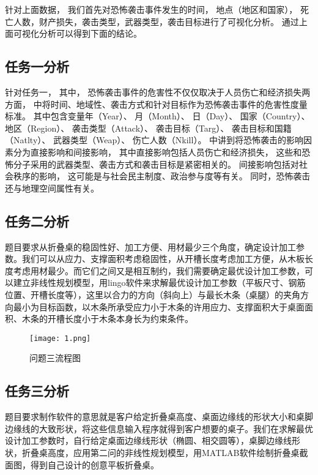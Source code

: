 \documentclass[bwprint]{gmcmthesis}
\begin{document}
针对上面数据，
我们首先对恐怖袭击事件发生的时间，
地点（地区和国家），
死亡人数，财产损失，袭击类型，武器类型，袭击目标进行了可视化分析。
通过上面可视化分析可以得到下面的结论。


\subsection{任务一分析}

针对任务一，
其中，
恐怖袭击事件的危害性不仅仅取决于人员伤亡和经济损失两方面，
\cite{贺怀清2012恐怖袭击事件不确定性度量及可视分析}
中将时间、地域性、袭击方式和针对目标作为恐怖袭击事件的危害性度量标准。
其中包含变量年（Year）、
月（Month）、
日（Day）、
国家（Country）、
地区（Region）、
袭击类型（Attack）、
袭击目标（Targ）、
袭击目标和国籍（Natlty）、
武器类型（Weap）、
伤亡人数（Nkill）。
\cite{李国辉2014全球恐怖袭击时空演变及风险分析研究}
中讲到将恐怖袭击的影响因素分为直接影响和间接影响，
其中直接影响包括人员伤亡和经济损失，
这些和恐怖分子采用的武器类型、袭击方式和袭击目标是紧密相关的。
间接影响包括对社会秩序的影响，
这可能是与社会民主制度、政治参与度等有关。
同时，恐怖袭击还与地理空间属性有关。


\subsection{任务二分析}
题目要求从折叠桌的稳固性好、加工方便、用材最少三个角度，确定设计加工参数。我们可以从应力、支撑面积考虑稳固性，从开槽长度考虑加工方便，从木板长度考虑用材最少。而它们之间又是相互制约，我们需要确定最优设计加工参数，可以建立非线性规划模型，用lingo软件来求解最优设计加工参数（平板尺寸、钢筋位置、开槽长度等），这里以合力的方向（斜向上）与最长木条（桌腿）的夹角方向最小为目标函数，以木条所承受应力小于木条的许用应力、支撑面积大于桌面面积、木条的开槽长度小于木条本身长为约束条件。
\begin{figure}[!h]
\centering
\texttt{[image: 1.png]}
\caption{问题三流程图}
\end{figure}
\subsection{任务三分析}
题目要求制作软件的意思就是客户给定折叠桌高度、桌面边缘线的形状大小和桌脚边缘线的大致形状，将这些信息输入程序就得到客户想要的桌子。我们在求解最优设计加工参数时，自行给定桌面边缘线形状（椭圆、相交圆等），桌脚边缘线形状，折叠桌高度，应用第二问的非线性规划模型，用MATLAB软件绘制折叠桌截面图，得到自己设计的创意平板折叠桌。
\end{document}
